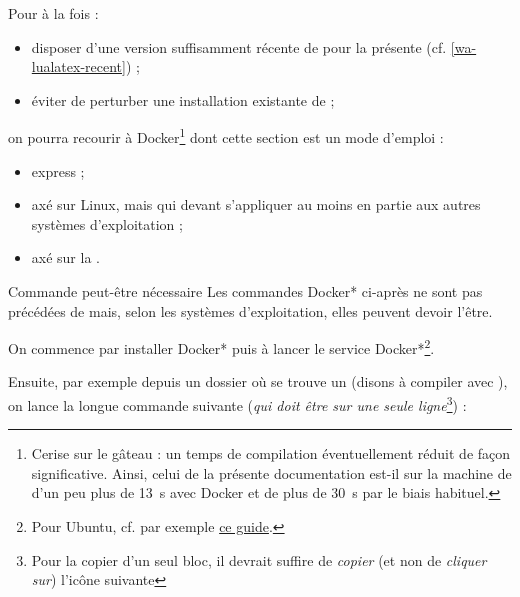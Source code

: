 \documentclass{letgut}
\def\docker{Docker}
\begin{document}
Pour à la fois :
\begin{itemize}
\item disposer d'une version suffisamment récente de 
  pour la présente  (cf. \vref{wa-lualatex-recent}) ;
\item éviter de perturber une installation existante de  ;
\end{itemize}
on pourra recourir à \docker{}\footnote{Cerise sur le gâteau : un temps de
  compilation éventuellement réduit de façon significative. Ainsi, celui de la
  présente documentation est-il sur la machine de  d'un
  peu plus de \SI{13}{\s} avec \docker{} et de plus de \SI{30}{\s} par le biais
  habituel.} dont cette section est un mode d'emploi :
\begin{itemize}
\item express ;
\item axé sur Linux, mais qui devant s'appliquer au moins en partie aux autres
  systèmes d'exploitation ;
\item axé sur la \tl{}.
\end{itemize}

\begin{dbwarning}{Commande  peut-être nécessaire}{}
  Les commandes \docker*{} ci-après ne sont pas précédées de 
  mais, selon les systèmes d'exploitation, elles peuvent devoir l'être.
\end{dbwarning}

On commence par installer \docker*{} puis à lancer le service
\docker*\footnote{Pour Ubuntu, cf. par exemple
  \href{https://doc.ubuntu-fr.org/docker}{ce guide}.}.

Ensuite, par exemple depuis un dossier où se trouve un  (disons
à compiler avec ), on lance la longue commande suivante
(\emph{qui doit être sur une seule ligne}\footnote{%
  Pour la copier d'un seul bloc, il devrait suffire de \emph{copier} (et non de
  \emph{cliquer sur}) l'icône suivante
  \faCopy[regular]%
  \EndAccSupp{}%
}) :

\end{document}
